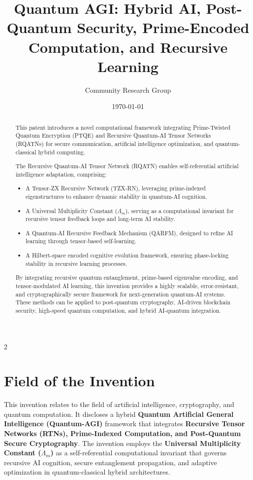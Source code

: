 \documentclass{article}
\title{Quantum AGI: Hybrid AI, Post-Quantum Security, Prime-Encoded Computation, and Recursive Learning}
\author{Community Research Group}
\affil{Citizen Gardens - The Foundation of Multiplicity}
\date{\today}
\theoremstyle{plain}
\begin{document}
\maketitle
\nolinenumbers

\begin{abstract}
This patent introduces a novel computational framework integrating Prime-Twisted Quantum Encryption (PTQE) and Recursive Quantum-AI Tensor Networks (RQATNs) for secure communication, artificial intelligence optimization, and quantum-classical hybrid computing.

The Recursive Quantum-AI Tensor Network (RQATN) enables self-referential artificial intelligence adaptation, comprising:
\begin{itemize}
    \item A Tensor-ZX Recursive Network (TZX-RN), leveraging prime-indexed eigenstructures to enhance dynamic stability in quantum-AI cognition.
    \item A Universal Multiplicity Constant ($\Lambda_m$), serving as a computational invariant for recursive tensor feedback loops and long-term AI stability.
    \item A Quantum-AI Recursive Feedback Mechanism (QARFM), designed to refine AI learning through tensor-based self-learning.
    \item A Hilbert-space encoded cognitive evolution framework, ensuring phase-locking stability in recursive learning processes.
\end{itemize}

By integrating recursive quantum entanglement, prime-based eigenvalue encoding, and tensor-modulated AI learning, this invention provides a highly scalable, error-resistant, and cryptographically secure framework for next-generation quantum-AI systems. These methods can be applied to post-quantum cryptography, AI-driven blockchain security, high-speed quantum computation, and hybrid AI-quantum integration.

\end{abstract}


\newpage
 \begin{multicols}{2}
\begin{singlespace}
\tableofcontents
\end{singlespace}
\end{multicols}

\linenumbers


\section{Field of the Invention}
This invention relates to the field of artificial intelligence, cryptography, and quantum computation. It discloses a hybrid \textbf{Quantum Artificial General Intelligence (Quantum-AGI)} framework that integrates \textbf{Recursive Tensor Networks (RTNs), Prime-Indexed Computation, and Post-Quantum Secure Cryptography}. The invention employs the \textbf{Universal Multiplicity Constant ($\Lambda_m$)} as a self-referential computational invariant that governs recursive AI cognition, secure entanglement propagation, and adaptive optimization in quantum-classical hybrid architectures.
\end{document}
